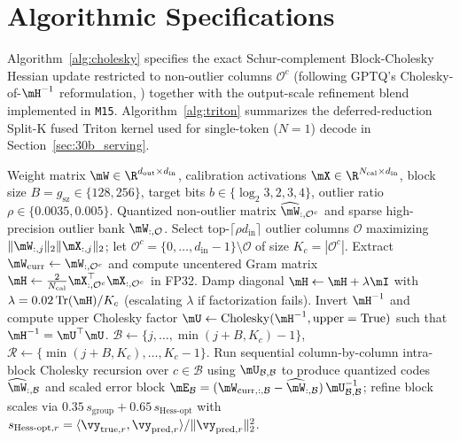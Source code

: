 \documentclass[10pt]{article} %
\begin{document}
\clearpage
\section{Algorithmic Specifications}
\label{app:algorithms}

Algorithm~\ref{alg:cholesky} specifies the exact Schur-complement Block-Cholesky Hessian update restricted to non-outlier columns $\mathcal{O}^c$ (following GPTQ's Cholesky-of-$\mH^{-1}$ reformulation, \citealp{frantar2023gptq}) together with the output-scale refinement blend implemented in \texttt{M15}. Algorithm~\ref{alg:triton} summarizes the deferred-reduction Split-K fused Triton kernel used for single-token ($N=1$) decode in Section~\ref{sec:30b_serving}.

\begin{algorithm}[htbp]
\caption{Damped block-Cholesky Hessian compensation restricted to non-outlier columns}
\label{alg:cholesky}
\small
\begin{algorithmic}[1]
\Require Weight matrix $\mW \in \R^{d_{\text{out}} \times d_{\text{in}}}$, calibration activations $\mX \in \R^{N_{\text{cal}} \times d_{\text{in}}}$, block size $B = g_{\text{sz}} \in \{128, 256\}$, target bits $b \in \{\log_2 3, 2, 3, 4\}$, outlier ratio $\rho \in \{0.0035, 0.005\}$.
\Ensure Quantized non-outlier matrix $\widehat{\mW}_{:,\mathcal{O}^c}$ and sparse high-precision outlier bank $\mW_{:,\mathcal{O}}$.
\State Select top-$\lceil \rho d_{\text{in}}\rceil$ outlier columns $\mathcal{O}$ maximizing $\|\mW_{:,j}\|_2 \|\mX_{:,j}\|_2$; let $\mathcal{O}^c = \{0,\dots,d_{\text{in}}-1\} \setminus \mathcal{O}$ of size $K_c = |\mathcal{O}^c|$.
\State Extract $\mW_{\text{curr}} \gets \mW_{:,\mathcal{O}^c}$ and compute uncentered Gram matrix $\mH \gets \frac{2}{N_{\text{cal}}}\mX_{:,\mathcal{O}^c}^\top \mX_{:,\mathcal{O}^c}$ in FP32.
\State Damp diagonal $\mH \gets \mH + \lambda \mI$ with $\lambda = 0.02\,\mathrm{Tr}(\mH)/K_c$ (escalating $\lambda$ if factorization fails).
\State Invert $\mH^{-1}$ and compute upper Cholesky factor $\mU \gets \mathrm{Cholesky}(\mH^{-1}, \text{upper}=\text{True})$ such that $\mH^{-1} = \mU^\top \mU$.
    \State $\mathcal{B} \gets \{j, \dots, \min(j+B, K_c)-1\}$, $\mathcal{R} \gets \{\min(j+B, K_c), \dots, K_c - 1\}$.
    \State Run sequential column-by-column intra-block Cholesky recursion over $c \in \mathcal{B}$ using $\mU_{\mathcal{B},\mathcal{B}}$ to produce quantized codes $\widehat{\mW}_{:,\mathcal{B}}$ and scaled error block $\mE_{\mathcal{B}} = (\mW_{\text{curr},:,\mathcal{B}} - \widehat{\mW}_{:,\mathcal{B}})\,\mU_{\mathcal{B},\mathcal{B}}^{-1}$; refine block scales via $0.35\,s_{\text{group}} + 0.65\,s_{\text{Hess-opt}}$ with $s_{\text{Hess-opt},r} = \langle \vy_{\text{true},r}, \vy_{\text{pred},r}\rangle / \|\vy_{\text{pred},r}\|_2^2$.

\end{algorithmic}
\end{algorithm}
\end{document}
